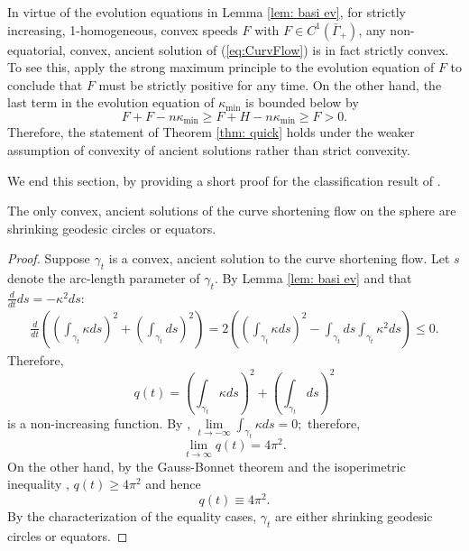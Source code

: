 \documentclass{amsart}
\begin{document}
\begin{rem}
In virtue of the evolution equations in Lemma \ref{lem: basi ev}, for strictly increasing, 1-homogeneous, convex speeds $F$ with $F\in C^1(\bar\Gamma_{+})$,  any non-equatorial, convex, ancient solution of (\ref{eq:CurvFlow}) is in fact strictly convex. To see this, apply the strong maximum principle to the evolution equation of $F$ to conclude that $F$ must be strictly positive for any time. On the other hand, the last term in the evolution equation of $\kappa_{\min}$ is bounded below by
\[F+F-n\kappa_{\min}\geq F+H-n\kappa_{\min}\ge F>0.\]
Therefore, the statement of Theorem \ref{thm: quick} holds under the weaker assumption of convexity of ancient solutions rather than strict convexity.
\end{rem}
We end this section, by providing a short proof for the classification result of \cite{BryanLouie:04/2016}.
\begin{thm}\cite{BryanLouie:04/2016}
The only convex, ancient solutions of the curve shortening flow on the sphere are shrinking geodesic circles or equators.
\end{thm}
\begin{proof}
Suppose $\gamma_t$ is a convex, ancient solution to the curve shortening flow. Let $s$ denote the arc-length parameter of $\gamma_t$. By Lemma \ref{lem: basi ev} and that $\frac{d}{dt}ds=-\kappa^2ds:$
\begin{align*}
\frac{d}{dt}\left(\left(\int_{\gamma_t}\kappa ds\right)^2+\left(\int_{\gamma_t}ds\right)^2\right)=2\left(\left(\int_{\gamma_t}\kappa ds\right)^2-\int_{\gamma_t}ds\int_{\gamma_t}\kappa^2ds\right)\leq 0.
\end{align*}
Therefore, 
\[q(t) = \left(\int_{\gamma_t}\kappa ds\right)^2+\left(\int_{\gamma_t}ds\right)^2 \]
is a non-increasing function. By \cite[Lemma 4.1]{BryanLouie:04/2016}, $\lim\limits_{t\to-\infty}\int_{\gamma_t}\kappa ds=0;$ therefore,
\[
\lim_{t\to \infty} q(t) = 4 \pi^2.
\]
On the other hand, by the Gauss-Bonnet theorem and the isoperimetric inequality \cite{Rado:10/1935}, $q(t) \geq 4\pi^2$ and hence $$q(t)\equiv 4\pi^2.$$
By the characterization of the equality cases, $\gamma_t$ are either shrinking geodesic circles or equators.
\end{proof}
\end{document}

